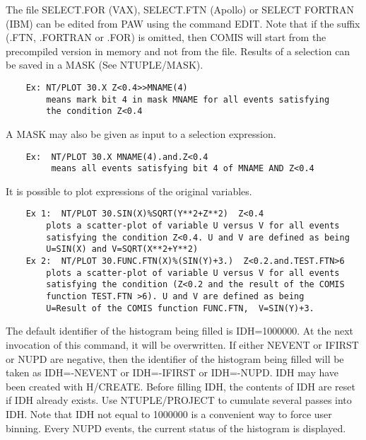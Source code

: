    \par
The file SELECT.FOR (VAX), SELECT.FTN (Apollo) or SELECT FORTRAN (IBM) can 
   be edited from PAW using the command EDIT. Note that if the suffix (.FTN, 
   .FORTRAN or .FOR) is omitted, then COMIS will start from the precompiled 
   version in memory and not from the file. Results of a selection can be 
   saved in a MASK (See NTUPLE/MASK).  
\begin{verbatim}
    Ex: NT/PLOT 30.X Z<0.4>>MNAME(4)
        means mark bit 4 in mask MNAME for all events satisfying
        the condition Z<0.4
\end{verbatim}
   \par
A MASK may also be given as input to a selection expression.  
\begin{verbatim}
    Ex:  NT/PLOT 30.X MNAME(4).and.Z<0.4
         means all events satisfying bit 4 of MNAME AND Z<0.4
\end{verbatim}
   \par
It is possible to plot expressions of the original variables.  
\begin{verbatim}
    Ex 1:  NT/PLOT 30.SIN(X)%SQRT(Y**2+Z**2)  Z<0.4
        plots a scatter-plot of variable U versus V for all events
        satisfying the condition Z<0.4. U and V are defined as being
        U=SIN(X) and V=SQRT(X**2+Y**2)
    Ex 2:  NT/PLOT 30.FUNC.FTN(X)%(SIN(Y)+3.)  Z<0.2.and.TEST.FTN>6
        plots a scatter-plot of variable U versus V for all events
        satisfying the condition (Z<0.2 and the result of the COMIS
        function TEST.FTN >6). U and V are defined as being
        U=Result of the COMIS function FUNC.FTN,  V=SIN(Y)+3.
\end{verbatim}
   \par
The default identifier of the histogram being filled is IDH=1000000.  At 
   the next invocation of this command, it will be overwritten.  If either 
   NEVENT or IFIRST or NUPD are negative, then the identifier of the histogram 
   being filled will be taken as IDH=-NEVENT or IDH=-IFIRST or IDH=-NUPD. IDH 
   may have been created with H/CREATE.  Before filling IDH, the contents of 
   IDH are reset if IDH already exists. Use NTUPLE/PROJECT to cumulate several 
   passes into IDH.  Note that IDH not equal to 1000000 is a convenient way to 
   force user binning.  Every NUPD events, the current status of the  
   histogram is displayed.  

\ENDCBIG


